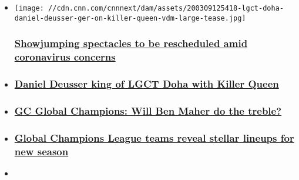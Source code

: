 \begin{itemize}
\item
  \href{/2020/03/12/sport/coronavirus-longines-tour-postponed-spt-intl/index.html}{}

  \texttt{[image: //cdn.cnn.com/cnnnext/dam/assets/200309125418-lgct-doha-daniel-deusser-ger-on-killer-queen-vdm-large-tease.jpg]}

  \hypertarget{showjumping-spectacles-to-be-rescheduled-amid-coronavirus-concerns}{%
  \subsubsection{\texorpdfstring{\href{/2020/03/12/sport/coronavirus-longines-tour-postponed-spt-intl/index.html}{Showjumping
  spectacles to be rescheduled amid coronavirus
  concerns}}{Showjumping spectacles to be rescheduled amid coronavirus concerns}}\label{showjumping-spectacles-to-be-rescheduled-amid-coronavirus-concerns}}
\item
  \hypertarget{daniel-deusser-king-of-lgct-doha-with-killer-queen-}{%
  \subsubsection{\texorpdfstring{\href{/2020/03/07/sport/doha-showjumping-deusser/index.html}{Daniel
  Deusser king of LGCT Doha with Killer Queen
  }}{Daniel Deusser king of LGCT Doha with Killer Queen }}\label{daniel-deusser-king-of-lgct-doha-with-killer-queen-}}
\item
  \hypertarget{gc-global-champions-will-ben-maher-do-the-treble-}{%
  \subsubsection{\texorpdfstring{\href{/2020/03/05/sport/global-champions-tour-eq-2020-preview-spt-intl/index.html}{GC
  Global Champions: Will Ben Maher do the treble?
  }}{GC Global Champions: Will Ben Maher do the treble? }}\label{gc-global-champions-will-ben-maher-do-the-treble-}}
\item
  \hypertarget{global-champions-league-teams-reveal-stellar-lineups-for-new-season}{%
  \subsubsection{\texorpdfstring{\href{/2020/02/05/sport/gcl-teams-equestrian-2020-spt-intl/index.html}{Global
  Champions League teams reveal stellar lineups for new
  season}}{Global Champions League teams reveal stellar lineups for new season}}\label{global-champions-league-teams-reveal-stellar-lineups-for-new-season}}
\item
  \hypertarget{longines-global-champions-tour-and-gcl-return-with-exciting-new-calendar}{%
}
\end{itemize}
